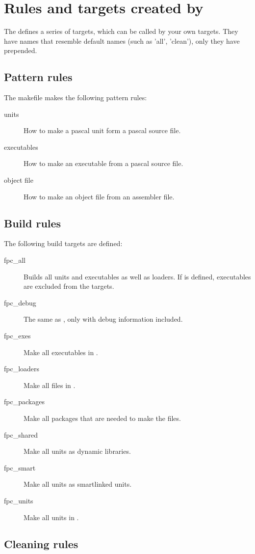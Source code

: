\section{Rules and targets created by \fpcmake{}}

The  defines a series of targets, which can be called by
your own targets. They have names that resemble default names (such as
'all', 'clean'), only they have  prepended.

\subsection{Pattern rules}

The makefile makes the following pattern rules:
\begin{description}
\item[units] How to make a pascal unit form a pascal source file.
\item[executables] How to make an executable from a pascal source file.
\item[object file] How to make an object file from an assembler file.
\end{description}

\subsection{Build rules}

The following build targets are defined:
\begin{description}
\item[fpc\_all] Builds all units and executables as well as
loaders. If  is defined, executables are excluded from the
targets.
\item[fpc\_debug] The same as , only with debug information
included.
\item[fpc\_exes] Make all executables in .
\item[fpc\_loaders] Make all files in .
\item[fpc\_packages] Make all packages that are needed to make
the files.
\item[fpc\_shared] Make all units as dynamic libraries.
\item[fpc\_smart] Make all units as smartlinked units.
\item[fpc\_units] Make all units in .
\end{description}

\subsection{Cleaning rules}

